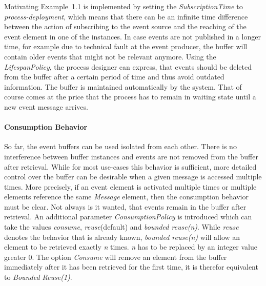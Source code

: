 Motivating Example~1.1 is implemented by setting the \textit{SubscriptionTime} to \textit{process-deployment}, which means that there can be an infinite time difference between the action of subscribing to the event source and the reaching of the event element in one of the instances.
In case events are not published in a longer time, for example due to technical fault at the event producer, the buffer will contain older events that might not be relevant anymore.
Using the \textit{LifespanPolicy}, the process designer can express, that events should be deleted from the buffer after a certain period of time and thus avoid outdated information. The buffer is maintained automatically by the system.
That of course comes at the price that the process has to remain in waiting state until a new event message arrives.

\paragraph{Consumption Behavior}

So far, the event buffers can be used isolated from each other. There is no interference between buffer instances and events are not removed from the buffer after retrieval.
While for most use-cases this behavior is sufficient, more detailed control over the buffer can be desirable when a given message is accessed multiple times. More precisely, if an event element is activated multiple times or multiple elements reference the same \textit{Message} element, then the consumption behavior must be clear.
Not always is it wanted, that events remain in the buffer after retrieval.
An additional parameter \textit{ConsumptionPolicy} is introduced which can take the values \textit{consume}, \textit{reuse}(default) and \textit{bounded reuse(n)}.
While \textit{reuse} denotes the behavior that is already known, \textit{bounded reuse(n)} will allow an element to be retrieved exactly \textit{n} times. \textit{n} has to be replaced by an integer value greater 0.
The option \textit{Consume} will remove an element from the buffer immediately after it has been retrieved for the first time, it is therefor equivalent to \textit{Bounded Reuse(1)}.

